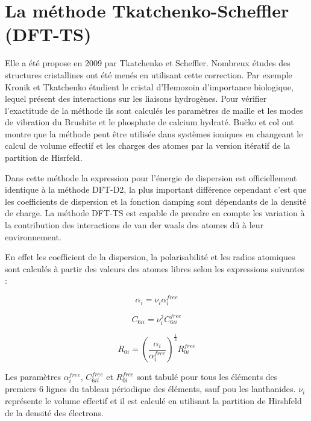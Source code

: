 	\bigskip
	\section{La méthode Tkatchenko-Scheffler (DFT-TS)}
	
	Elle a été propose en 2009 par Tkatchenko et Scheffler\cite{tkatchenko2009accurate}. Nombreux études des structures cristallines ont été menés en utilisant cette correction. Par exemple Kronik et Tkatchenko\cite{kronik2014understanding} étudient le cristal d'Hemozoin d'importance biologique, lequel présent des interactions sur les liaisons hydrogènes. Pour vérifier l'exactitude de la méthode ils sont calculés les paramètres de maille et les modes de vibration du Brushite et le phosphate de calcium hydraté. Bu\u{c}ko et col\cite{buvcko2014extending} ont montre que la méthode peut être utilisée dans systèmes ioniques en changeant le calcul de volume effectif et les charges des atomes par la version itératif de la partition de Hisrfeld.
	
	Dans cette méthode la expression pour l'énergie de dispersion est officiellement identique à la méthode DFT-D2, la plus important différence cependant c'est que les coefficients de dispersion et la fonction damping sont dépendants de la densité de charge. La méthode DFT-TS est capable de prendre en compte les variation à la contribution des interactions de van der waals des atomes dû à leur environnement. 
	
	En effet les coefficient de la dispersion, la polarisabilité et les radios atomiques sont calculés à partir des valeurs des atomes libres selon les expressions suivantes :
	
	\begin{equation}
	\alpha_{i} = \nu_{i} \alpha_{i}^{free}
	\end{equation}
	
	\begin{equation}
	C_{6ii} = \nu_{i}^{2} C_{6ii}^{free}
	\end{equation}
	
	\begin{equation}
	R_{0i} = \left(\frac{\alpha_{i}}{\alpha_{i}^{free}}\right)^{\frac{1}{3}} R_{0i}^{free}
	\end{equation}
	
	Les paramètres $\alpha_{i}^{free}$, $C_{6ii}^{free}$ et $R_{0i}^{free}$ sont tabulé pour tous les éléments des premiers 6 lignes du tableau périodique des éléments, sauf pou les lanthanides. $\nu_{i}$ représente le volume effectif et il est calculé en utilisant la partition de Hirshfeld de la densité des électrons. 
	
